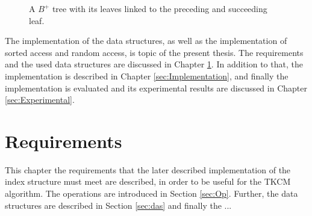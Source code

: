 \documentclass[abstracton,12pt]{scrreprt}
\begin{document}
\begin{figure}[H]
	\centering
	\caption{A $B^+$ tree with its leaves linked to the preceding and succeeding leaf.}
	\label{fig:sptree}
\end{figure}



The implementation of the data structures, as well as the implementation of sorted access and random access, is topic of the present thesis. The requirements and the used data structures are discussed in Chapter \ref{sec:P}. In addition to that, the implementation is described in Chapter \ref{sec:Implementation}, and finally the implementation is evaluated and its experimental results are discussed in Chapter \ref{sec:Experimental}.  


\chapter{Requirements}
\label{sec:P}
This chapter the requirements that the later described implementation of the index structure must meet are described, in order to be useful for the TKCM algorithm. The operations are introduced in Section \ref{sec:Op}. Further, the data structures are described in Section \ref{sec:das} and finally the ...
\end{document}
